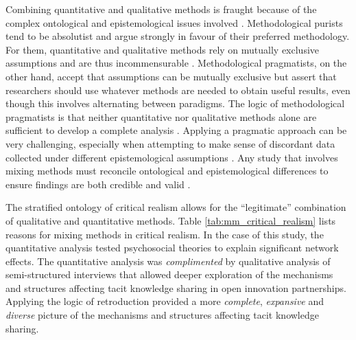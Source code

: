 Combining quantitative and qualitative methods is fraught because of the complex ontological and epistemological issues involved \citep{giddings2006mixed,mcevoy2006critical}. Methodological purists tend to be absolutist and argue strongly in favour of their preferred methodology. For them, quantitative and qualitative methods rely on mutually exclusive assumptions and are thus incommensurable \citep{greene2008mixed}. Methodological pragmatists, on the other hand, accept that assumptions can be mutually exclusive but assert that researchers should use whatever methods are needed to obtain useful results, even though this involves alternating between paradigms. The logic of methodological pragmatists is that neither quantitative nor qualitative methods alone are sufficient to develop a complete analysis \citep{mcevoy2006critical,creswell2013research}. Applying a pragmatic approach can be very challenging, especially when attempting to make sense of discordant data collected under different epistemological assumptions \citep{johnson2004mixed,giddings2006mixed}. Any study that involves mixing methods must reconcile ontological and epistemological differences to ensure findings are both credible and valid \citep{zachariadis2013methodological}. \medskip

The stratified ontology of critical realism allows for the \enquote{legitimate} combination of qualitative and quantitative methods. Table \ref{tab:mm_critical_realism} lists reasons for mixing methods in critical realism. In the case of this study, the quantitative analysis tested psychosocial theories to explain significant network effects. The quantitative analysis was \textit{complimented} by qualitative analysis of semi-structured interviews that allowed deeper exploration of the mechanisms and structures affecting tacit knowledge sharing in open innovation partnerships. Applying the logic of retroduction provided a more \textit{complete}, \textit{expansive} and \textit{diverse} picture of the mechanisms and structures affecting tacit knowledge sharing. \medskip

